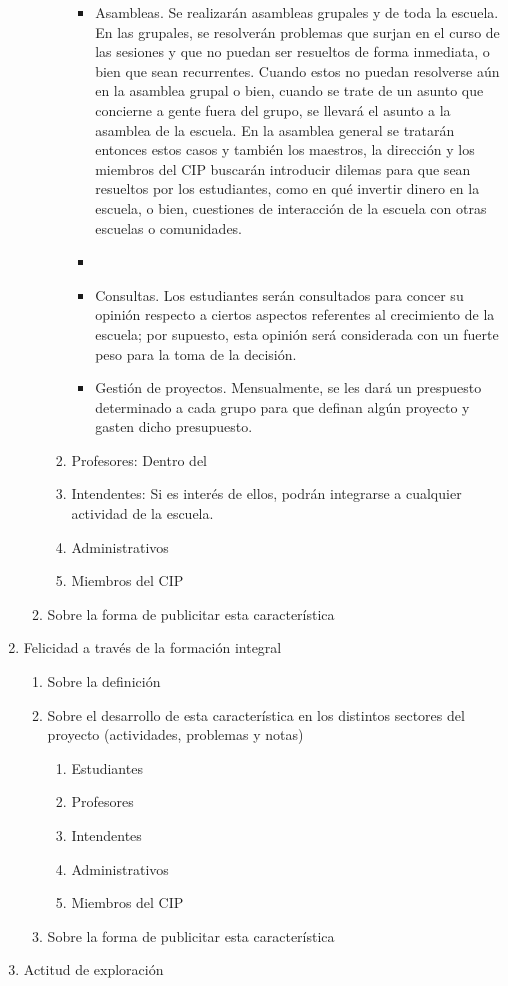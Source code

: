 \documentclass[10pt,letterpaper]{report}
\begin{document}
\begin{enumerate}
\begin{enumerate}[label*=\arabic*.]
\begin{enumerate}[label*=\arabic*.]
\begin{itemize}
		\item Asambleas. Se realizarán asambleas grupales y de toda la escuela. En las grupales, se resolverán problemas que surjan en el curso de las sesiones y que no puedan ser resueltos de forma inmediata, o bien que sean recurrentes. Cuando estos no puedan resolverse aún en la asamblea grupal o bien, cuando se trate de un asunto que concierne a gente fuera del grupo, se llevará el asunto a la asamblea de la escuela. En la asamblea general se tratarán entonces estos casos y también los maestros, la dirección y los miembros del CIP buscarán introducir dilemas para que sean resueltos por los estudiantes, como en qué invertir dinero en la escuela, o bien, cuestiones de interacción de la escuela con otras escuelas o comunidades.
		\item 
		\item Consultas. Los estudiantes serán consultados para concer su opinión respecto a ciertos aspectos referentes al crecimiento de la escuela; por supuesto, esta opinión será considerada con un fuerte peso para la toma de la decisión.
		\item Gestión de proyectos. Mensualmente, se les dará un prespuesto determinado a cada grupo para que definan algún proyecto y gasten dicho presupuesto.
\end{itemize}					

			\item Profesores: Dentro del 
			\item Intendentes: Si es interés de ellos, podrán integrarse a cualquier actividad de la escuela.
			\item Administrativos
			\item Miembros del CIP
			\end{enumerate}
		\item Sobre la forma de publicitar esta característica
		\end{enumerate}
	\item Felicidad a través de la formación integral
		\begin{enumerate}[label*=\arabic*.]
		\item Sobre la definición
		\item Sobre el desarrollo de esta característica en los distintos sectores del proyecto (actividades, problemas y notas)
			\begin{enumerate}[label*=\arabic*.]
			\item Estudiantes
			\item Profesores
			\item Intendentes
			\item Administrativos
			\item Miembros del CIP
			\end{enumerate}
		\item Sobre la forma de publicitar esta característica
		\end{enumerate}
	\item Actitud de exploración
	

\end{enumerate}
\end{document}
